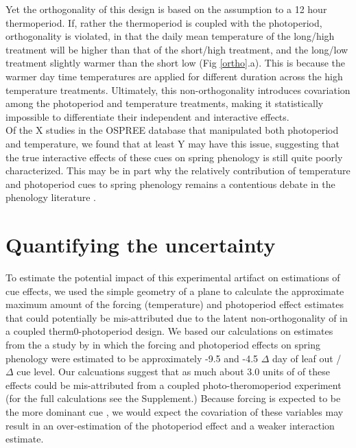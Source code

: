 \documentclass[11pt]{article}
\begin{document}
Yet the orthogonality of this design is based on the assumption to a 12 hour thermoperiod. If, rather the thermoperiod is coupled with the photoperiod, orthogonality is violated, in that the daily mean temperature of the long/high treatment will be higher than that of the short/high treatment, and the long/low treatment slightly warmer than the short low (Fig \ref{ortho}.a). This is because the warmer day time temperatures are applied for different duration across the high temperature treatments. Ultimately, this non-orthogonality introduces covariation among the photoperiod and temperature treatments, making it statistically impossible to differentiate their independent and interactive effects.\\

Of the X studies in the OSPREE database that manipulated both photoperiod and temperature, we found that at least  Y may have this issue, suggesting that the true interactive effects of these cues on spring phenology is still quite poorly characterized. This may be in part why the relatively contribution of temperature and photoperiod cues to spring phenology remains a contentious debate in the phenology literature \citep{}.

\section*{Quantifying the uncertainty}
To estimate the potential impact of this experimental artifact on estimations of cue effects, we used the simple geometry of a plane to calculate the approximate maximum amount of the forcing (temperature) and photoperiod effect estimates that could potentially be mis-attributed due to the latent non-orthogonality of in a coupled therm0-photoperiod design. We based our calculations on estimates from the a study by \citet{} in which the forcing and photoperiod effects on spring phenology were estimated to be approximately -9.5 and -4.5  $\Delta$ day of leaf out / $\Delta$ cue level. Our calcuations suggest that as much about 3.0 units of of these effects could be mis-attributed from a coupled photo-theromoperiod experiment (for the full calculations see the Supplement.) Because forcing is expected to be the more dominant cue \citep{}, we would expect the covariation of these variables may result in an over-estimation of the photoperiod effect and a weaker interaction estimate. \\

\end{document}
